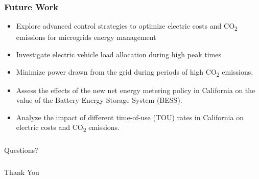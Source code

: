 \documentclass[aspectratio=169, 8 pt]{beamer}
\begin{document}
	\begin{frame}
		\frametitle{Future Work}
		\begin{itemize} \LARGE
			\item Explore advanced control strategies to optimize electric costs and CO\textsubscript{2} emissions for microgrids energy management
			\item Investigate electric vehicle load allocation during high peak times
			\item Minimize power drawn from the grid during periods of high CO\textsubscript{2} emissions.
			\item Assess the effects of the new net energy metering policy in California on the value of the Battery Energy Storage System (BESS).
			\item Analyze the impact of different time-of-use (TOU) rates in California on electric costs and CO\textsubscript{2} emissions.
		\end{itemize}
	\end{frame}
	
	\begin{frame}
		\frametitle{\null}
		\centering
		\Huge
		Questions?
	\end{frame}
	
	\begin{frame}
		\frametitle{\null}
		\centering
		\Huge
		Thank You
	\end{frame}
\end{document}
